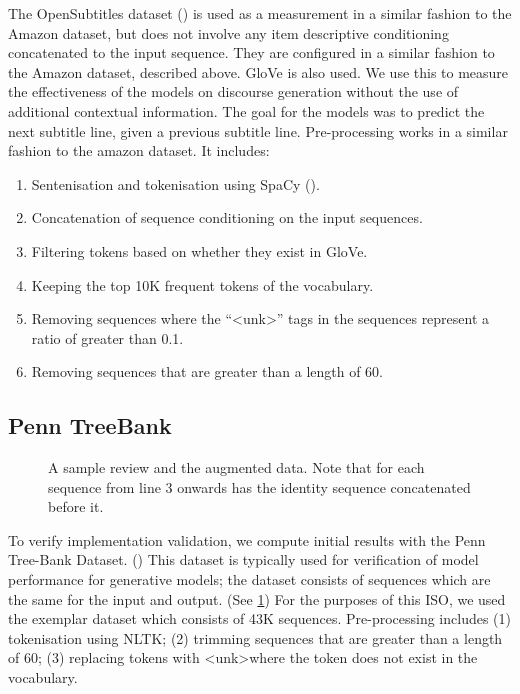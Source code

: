\documentclass[12pt,twoside]{report}
\begin{document}
The OpenSubtitles dataset (\cite{lison_opensubtitles2016:_2016}) is used as a measurement in a similar fashion to the Amazon dataset, but does not involve any item descriptive conditioning concatenated to the input sequence. They are configured in a similar fashion to the Amazon dataset, described above. GloVe is also used. We use this to measure the effectiveness of the models on discourse generation without the use of additional contextual information. The goal for the models was to predict the next subtitle line, given a previous subtitle line. Pre-processing works in a similar fashion to the amazon dataset. It includes:


\begin{enumerate}  
	\item Sentenisation and tokenisation using SpaCy (\cite{honnibal_spacy_2017}).
	\item Concatenation of sequence conditioning on the input sequences.
	\item Filtering tokens based on whether they exist in GloVe.
	\item Keeping the top 10K frequent tokens of the vocabulary.
	\item Removing sequences where the ``\textless{}unk\textgreater'' tags in the sequences represent a ratio of greater than 0.1.
	\item Removing sequences that are greater than a length of 60. 
\end{enumerate}

\subsection{Penn TreeBank}

\begin{figure}[!ht]
	\centering
	
	\caption{A sample review and the augmented data. Note that for each sequence from line 3 onwards has the identity sequence concatenated before it. \label{ex_dataset:ptb}}
	\end{figure}

To verify implementation validation, we compute initial results with the Penn Tree-Bank Dataset. (\cite{marcus_building_2002}) This dataset is typically used for verification of model performance for generative models; the dataset consists of sequences which are the same for the input and output. (See \ref{ex_dataset:ptb}) For the purposes of this ISO, we used the exemplar dataset which consists of 43K sequences. Pre-processing includes (1) tokenisation using NLTK; (2) trimming sequences that are greater than a length of 60; (3) replacing tokens with \textless{}unk\textgreater where the token does not exist in the vocabulary. 
\end{document}
